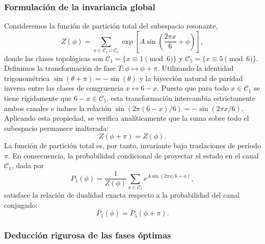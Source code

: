 \documentclass[12pt,a4paper]{article}
\theoremstyle{plain}
\theoremstyle{definition}
\theoremstyle{remark}
\begin{document}
\subsubsection*{Formulación de la invariancia global}

Consideremos la función de partición total del subespacio resonante,
\begin{equation}
Z(\phi) = \sum_{x \in \mathcal{C}_1 \cup \mathcal{C}_5} \exp\left[A \sin\left(\frac{2\pi x}{6} + \phi\right)\right],
\end{equation}
donde las clases topológicas son $\mathcal{C}_1 = \{x \equiv 1 \pmod{6}\}$ y $\mathcal{C}_5 = \{x \equiv 5 \pmod{6}\}$. Definimos la transformación de fase $T: \phi \mapsto \phi + \pi$. Utilizando la identidad trigonométrica $\sin(\theta+\pi) = -\sin(\theta)$ y la biyección natural de paridad inversa entre las clases de congruencia $x \leftrightarrow 6-x$. Puesto que para todo $x \in \mathcal{C}_1$ se tiene rígidamente que $6-x \in \mathcal{C}_5$, esta transformación intercambia estrictamente ambos canales e induce la relación $\sin(2\pi(6-x)/6) = -\sin(2\pi x/6)$. Aplicando esta propiedad, se verifica analíticamente que la suma sobre todo el subespacio permanece inalterada:
\begin{equation}
Z(\phi + \pi) = Z(\phi).
\label{eq:periodicidad_Z}
\end{equation}
La función de partición total es, por tanto, invariante bajo traslaciones de período $\pi$. En consecuencia, la probabilidad condicional de proyectar el estado en el canal $\mathcal{C}_1$, dada por
\begin{equation}
P_1(\phi) = \frac{1}{Z(\phi)}\sum_{x\in\mathcal{C}_1} e^{A\sin(2\pi x/6 + \phi)},
\end{equation}
satisface la relación de dualidad exacta respecto a la probabilidad del canal conjugado:
\begin{equation}
P_1(\phi) = P_5(\phi+\pi).
\label{eq:dualidad_prob}
\end{equation}

\subsubsection*{Deducción rigurosa de las fases óptimas}
\end{document}
